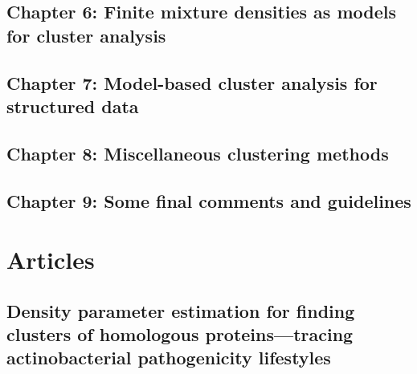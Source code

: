 \documentclass[a4paper,10pt]{article}
\begin{document}
\subsection{Chapter 6: Finite mixture densities as models for cluster analysis}

\subsection{Chapter 7: Model-based cluster analysis for structured data}

\subsection{Chapter 8: Miscellaneous clustering methods}

\subsection{Chapter 9: Some final comments and guidelines}

\newpage
\section{Articles}

\subsection{Density parameter estimation for finding clusters of homologous proteins—tracing actinobacterial pathogenicity lifestyles}
\end{document}
